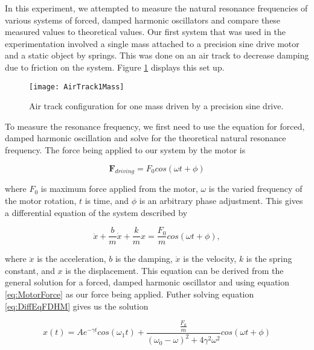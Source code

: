 \par In this experiment, we attempted to measure the natural resonance frequencies of various systems of forced, damped harmonic oscillators and compare these measured values to theoretical values. Our first system that was used in the experimentation involved a single mass attached to a precision sine drive motor and a static object by springs. This was done on an air track to decrease damping due to friction on the system. Figure \ref{figure:AirTrack1Mass} displays this set up.

\begin{figure}[htb!]
\centering
\texttt{[image: AirTrack1Mass]}
\caption{Air track configuration for one mass driven by a precision sine drive.}
\label{figure:AirTrack1Mass}
\end{figure}

\par To measure the resonance frequency, we first need to use the equation for forced, damped harmonic oscillation and solve for the theoretical natural resonance frequency. The force being applied to our system by the motor is

\begin{equation}
\textbf{F}_{driving} = F_0 cos(\omega t + \phi)
\label{eq:MotorForce}
\end{equation}

\noindent where $F_0$ is maximum force applied from the motor, $\omega$ is the varied frequency of the motor rotation, $t$ is time, and $\phi$ is an arbitrary phase adjustment. This gives a differential equation of the system described by

\begin{equation}
\ddot{x} + \frac{b}{m}\dot{x} + \frac{k}{m}x = \frac{F_0}{m} cos(\omega t + \phi) ,
\label{eq:DiffEqFDHM}
\end{equation}

\noindent where $\ddot{x}$ is the acceleration, $b$ is the damping, $\dot{x}$ is the velocity, $k$ is the spring constant, and $x$ is the displacement. This equation can be derived from the  general solution for a forced, damped harmonic oscillator and using equation \ref{eq:MotorForce} as our force being applied. Futher solving equation \ref{eq:DiffEqFDHM} gives us the solution

\begin{equation}
x(t) = Ae^{- \gamma t} cos( \omega_1 t) + \frac{\frac{F_0}{m}}{(\omega_0 - \omega)^2 + 4 \gamma^2 \omega^2} cos(\omega t + \phi)
\label{eq:solution1cart}
\end{equation}

